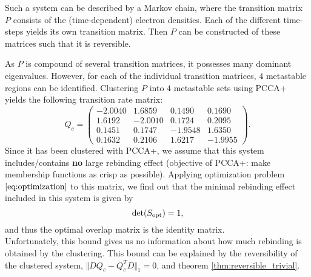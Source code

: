 Such a system can be described by a Markov chain, where the transition matrix $P$ consists of the (time-dependent) electron densities. %
Each of the different time-steps yields its own transition matrix. Then $P$ can be constructed of these matrices such that it is reversible.
 
 As $P$ is compound of several transition matrices, it possesses many dominant eigenvalues. However, for each of the individual transition matrices, $4$ metastable regions can be identified. 
Clustering $P$ into $4$ metastable sets using PCCA+ yields the following transition rate matrix: %
\begin{equation*}
Q_c = 
\begin{pmatrix}
-2.0040  &  1.6859  &  0.1490  &  0.1690 \\
1.6192 &  -2.0010  &  0.1724  &  0.2095  \\
0.1451  &  0.1747 &  -1.9548  &  1.6350  \\
0.1632  &  0.2106  &  1.6217  & -1.9955
\end{pmatrix}.
\end{equation*}
Since it has been clustered with PCCA+, we assume that this system includes/contains \textbf{no} large rebinding effect (objective of PCCA+: make membership functions as crisp as possible).
Applying optimization problem $\eqref{eq:optimization}$ to this matrix, we find out that the minimal rebinding effect included in this system is given by
\begin{equation*}
\det(S_{\mathrm{opt}}) = 1,
\end{equation*}
and thus the optimal overlap matrix is the identity matrix.
\\

Unfortunately, this bound gives us no information about how much rebinding is obtained by the clustering.
This bound can be explained by the reversibility of the clustered system, $\Vert DQ_c - Q_c^T D \Vert_1 = 0$, and theorem \ref{thm:reversible_trivial}.
\\

